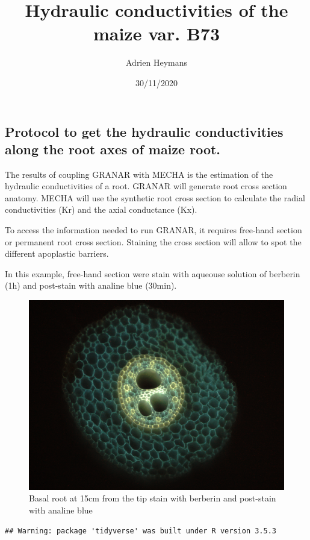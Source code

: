 \documentclass[]{article}
\title{Hydraulic conductivities of the maize var. B73}
\author{Adrien Heymans}
\date{30/11/2020}
\begin{document}
\maketitle

\subsection{Protocol to get the hydraulic conductivities along the root
axes of maize
root.}\label{protocol-to-get-the-hydraulic-conductivities-along-the-root-axes-of-maize-root.}

The results of coupling GRANAR with MECHA is the estimation of the
hydraulic conductivities of a root. GRANAR will generate root cross
section anatomy. MECHA will use the synthetic root cross section to
calculate the radial conductivities (Kr) and the axial conductance (Kx).

To access the information needed to run GRANAR, it requires free-hand
section or permanent root cross section. Staining the cross section will
allow to spot the different apoplastic barriers.

In this example, free-hand section were stain with aqueouse solution of
berberin (1h) and post-stain with analine blue (30min).

\begin{figure}
\centering
\includegraphics{Image_000334.png}
\caption{Basal root at 15cm from the tip stain with berberin and
post-stain with analine blue}
\end{figure}

\begin{verbatim}
## Warning: package 'tidyverse' was built under R version 3.5.3
\end{verbatim}
\end{document}
